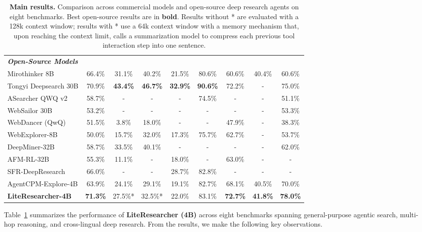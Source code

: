 \documentclass{article} %
\theoremstyle{plain}
\theoremstyle{definition}
\theoremstyle{remark}
\begin{document}
\begin{table}[h]
\begin{tabular}{l ccc ccc cc}
        \midrule
        \multicolumn{9}{l}{\textit{\textbf{Open-Source Models}}} \\
        Mirothinker 8B & 66.4\% & 31.1\% & 40.2\% & 21.5\% & 80.6\% & 60.6\% & 40.4\% & 60.6\% \\
        Tongyi Deepsearch 30B & 70.9\% & \textbf{43.4\%} & \textbf{46.7\%} & \textbf{32.9\%} & \textbf{90.6\%} & 72.2\% & - & 75.0\% \\
        ASearcher QWQ v2 & 58.7\% & - & - & - & 74.5\% & - & - & 51.1\% \\
        WebSailor 30B & 53.2\% & - & - & - & - & - & - & 53.3\% \\
        WebDancer (QwQ) & 51.5\% & 3.8\% & 18.0\% & - & - & 47.9\% & - & 38.3\% \\
        WebExplorer-8B & 50.0\% & 15.7\% & 32.0\% & 17.3\% & 75.7\% & 62.7\% & - & 53.7\% \\
        DeepMiner-32B & 58.7\% & 33.5\% & 40.1\% & - & - & - & - & 62.0\% \\
        AFM-RL-32B & 55.3\% & 11.1\% & - & 18.0\% & - & 63.0\% & - & - \\
        SFR-DeepResearch & 66.0\% & - & - & 28.7\% & 82.8\% & - & - & - \\
        AgentCPM-Explore-4B & 63.9\% & 24.1\% & 29.1\% & 19.1\% & 82.7\% & 68.1\% & 40.5\% & 70.0\% \\
        \midrule
        \rowcolor{blue!10} \textbf{LiteResearcher-4B} & \textbf{71.3\%} & 27.5\%* & 32.5\%* & 22.0\% & 83.1\% & \textbf{72.7\%} & \textbf{41.8\%} & \textbf{78.0\%} \\
        \bottomrule
    \end{tabular}
    \caption{\textbf{Main results.} Comparison across commercial models and open-source deep research agents on eight benchmarks. Best open-source results are in \textbf{bold}. Results without * are evaluated with a 128k context window; results with * use a 64k context window with a memory mechanism that, upon reaching the context limit, calls a summarization model to compress each previous tool interaction step into one sentence.}
    \label{tab:main_results_1}
\end{table}
\nocite{anthropic2025claude4_5,liu2024deepseekv3,minimax2025m2,openai2025gpt5,zeng2025glm,moonshot2025kimi_researcher,team2025kimi,team2025mirothinker,team2025tongyi,li2025websailor,wu2025webdancer,liu2025webexplorer,tang2025beyond,li2025chain,nguyen2025sfr,chen2026agentcpm}



Table~\ref{tab:main_results_1} summarizes the performance of \textbf{LiteResearcher (4B)} across eight benchmarks spanning general-purpose agentic search, multi-hop reasoning, and cross-lingual deep research. From the results, we make the following key observations.
\end{document}
